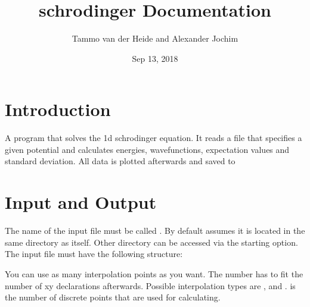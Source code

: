 \documentclass[letterpaper,10pt,english]{sphinxmanual}
\title{schrodinger Documentation}
\date{Sep 13, 2018}
\author{Tammo van der Heide and Alexander Jochim}
\begin{document}
\maketitle
\sphinxtableofcontents
{}\label{\detokenize{index::doc}}



\chapter{Introduction}
\label{\detokenize{index:schrodinger}}\label{\detokenize{index:introduction}}
A program that solves the 1d schrodinger equation. It reads
a file  that specifies a given potential and calculates
energies, wavefunctions, expectation values and standard deviation. All data
is plotted afterwards and saved to 


\chapter{Input and Output}
\label{\detokenize{index:input-and-output}}
The name of the input file must be called . By default
 assumes it is located in the same directory as itself.
Other directory can be accessed via the  starting option. The input file
must have the following structure:

%
\begin{sphinxVerbatim}[commandchars=\\\{\}]
           
   
            
    
             
 
 
 
\end{sphinxVerbatim}

You can use as many interpolation points as you want. The number has to fit
the number of xy declarations afterwards. Possible interpolation types are
,  and .  is the number of discrete
points that are used for calculating.
\end{document}
